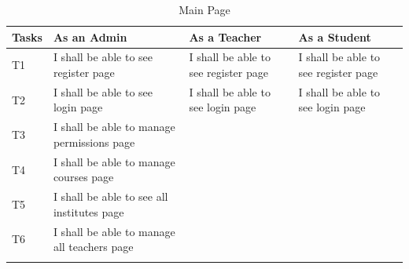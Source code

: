 \documentclass[12pt]{article}
\begin{document}
\begin{longtable}{|p{2cm}|p{4cm}|p{4cm}|p{4cm}|}
\hline
\textbf{Tasks} & \textbf{As an Admin} & \textbf{As a Teacher} & \textbf{As a Student}\\
\hline
T1 &
I shall be able to see register page &
I shall be able to see register page &
I shall be able to see register page \\
\hline

T2 &
I shall be able to see login page &
I shall be able to see login page &
I shall be able to see login page \\
\hline

T3 &
I shall be able to manage permissions page & & \\
\hline

T4 &
I shall be able to manage courses page & & \\
\hline

T5 &
I shall be able to see all institutes page & & \\
\hline

T6 &
I shall be able to manage all teachers page & & \\
\hline
\caption{Main Page}
\end{longtable}



\end{document}
